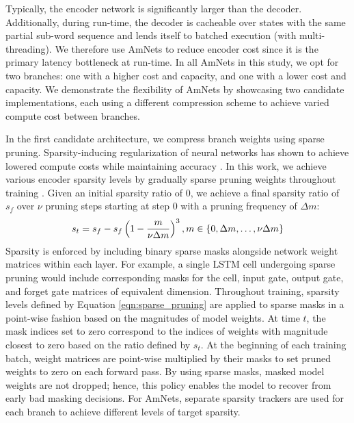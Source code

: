 \documentclass[a4paper]{article}
\newcommand{\steps}{m}
\begin{document}
Typically, the encoder network is significantly larger than the decoder.
Additionally, during run-time, the decoder is cacheable over states with the same partial sub-word sequence and lends itself to batched execution (with multi-threading).
We therefore use AmNets to reduce encoder cost since it is the primary latency bottleneck at run-time. 
In all AmNets in this study, we opt for two branches: one with a higher cost and capacity, and one with a lower cost and capacity. We demonstrate the flexibility of AmNets by showcasing two candidate implementations, each using a different compression scheme to achieve varied compute cost between branches.

In the first candidate architecture, we compress branch weights using sparse pruning. Sparsity-inducing regularization of neural networks has shown to achieve lowered compute costs while maintaining accuracy \cite{Wu2020-Sparsity, Hastie2015, Zhou2019, Gale2019, Hebiri2020}. In this work, we achieve various encoder sparsity levels by gradually sparse pruning weights throughout training \cite{Zhu2018}. Given an initial sparsity ratio of 0, we achieve a final sparsity ratio of $s_f$ over $\nu$ pruning steps starting at step 0 with a pruning frequency of $\Delta \steps$:
\noindent
\begin{align}\label{eqn:sparse_pruning}
	\noindent
	s_t = s_f - s_f\left (1 - \frac{\steps}{\nu\Delta \steps}\right )^3, m \in \{0, \Delta \steps, \ldots, \nu \Delta \steps\}
\end{align}
\noindent
Sparsity is enforced by including binary sparse masks alongside network weight matrices within each layer. 
For example, a single LSTM cell undergoing sparse pruning would include corresponding masks for the cell, input gate, output gate, and forget gate matrices of equivalent dimension. 
Throughout training, sparsity levels defined by Equation \ref{eqn:sparse_pruning} are applied to sparse masks in a point-wise fashion based on the magnitudes of model weights. 
At time $t$, the mask indices set to zero correspond to the indices of weights with magnitude closest to zero based on the ratio defined by $s_t$. 
At the beginning of each training batch, weight matrices are point-wise multiplied by their masks to set pruned weights to zero on each forward pass. 
By using sparse masks, masked model weights are not dropped; hence, this policy enables the model to recover from early bad masking decisions.
For AmNets, separate sparsity trackers are used for each branch to achieve different levels of target sparsity.
\end{document}
